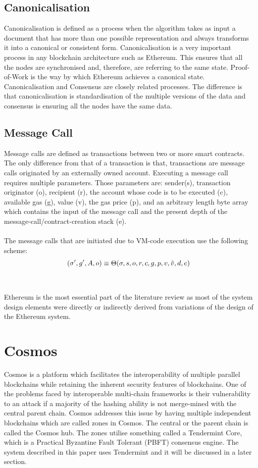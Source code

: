 \documentclass[a4paper,twoside,phd]{BYUPhys}
\begin{document}
\subsection{Canonicalisation}
Canonicalisation is defined as a process when the algorithm takes as input a document that has more than one possible representation and always transforms it into a canonical or consistent form\cite{}. Canonicalisation is a very important process in any blockchain architecture such as Ethereum. This ensures that all the nodes are synchronised and, therefore, are referring to the same state. Proof-of-Work is the way by which Ethereum achieves a canonical state\cite{}. Canonicalisation and Consensus are closely related processes. The difference is that canonicalisation is standardisation of the multiple versions of the data and consensus is ensuring all the nodes have the same data.
\subsection{Message Call}
Message calls are defined as transactions between two or more smart contracts\cite{}. The only difference from that of a transaction is that, transactions are message calls originated by an externally owned account. Executing a message call requires multiple parameters. Those parameters are: sender(s), transaction originator (o), recipient (r), the account whose code is to be executed (c), available gas (g), value (v), the gas price (p), and an arbitrary length byte array which contains the input of the message call and the present depth of the message-call/contract-creation stack (e)\cite{}.
\\ 
\\ 
The message calls that are initiated due to VM-code execution use the following scheme\cite{}:
\[(\sigma', g', A, o)\equiv \Theta(\sigma, s, o, r, c, g, p, v, \Tilde{v}, d, e)\]
\\
\\
Ethereum is the most essential part of the literature review as most of the system design elements were directly or indirectly derived from variations of the design of the Ethereum system. 
\section{Cosmos}
Cosmos is a platform which facilitates the interoperability of multiple parallel blockchains while retaining the inherent security features of blockchains\cite{}. One of the problems faced by interoperable multi-chain frameworks is their vulnerability to an attack if a majority of the hashing ability is not merge-mined with the central parent chain. Cosmos addresses this issue by having multiple independent blockchains which are called zones in Cosmos. The central or the parent chain is called the Cosmos hub. The zones utilise something called a Tendermint Core, which is a Practical Byzantine Fault Tolerant (PBFT) consensus engine\cite{}. The system described in this paper uses Tendermint and it will be discussed in a later section.
\end{document}
